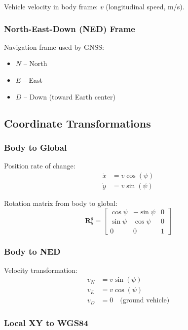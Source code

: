 \documentclass[11pt,a4paper]{article}
\begin{document}
Vehicle velocity in body frame: $v$ (longitudinal speed, m/s).

\subsubsection{North-East-Down (NED) Frame}

Navigation frame used by GNSS:
\begin{itemize}
    \item $N$ -- North
    \item $E$ -- East
    \item $D$ -- Down (toward Earth center)
\end{itemize}

\subsection{Coordinate Transformations}

\subsubsection{Body to Global}

Position rate of change:
\begin{align}
\dot{x} &= v \cos(\psi) \label{eq:xdot}\\
\dot{y} &= v \sin(\psi) \label{eq:ydot}
\end{align}

Rotation matrix from body to global:
\begin{equation}
\mathbf{R}_b^g = \begin{bmatrix}
\cos\psi & -\sin\psi & 0 \\
\sin\psi & \cos\psi & 0 \\
0 & 0 & 1
\end{bmatrix}
\end{equation}

\subsubsection{Body to NED}

Velocity transformation:
\begin{align}
v_N &= v \sin(\psi) \\
v_E &= v \cos(\psi) \\
v_D &= 0 \quad \text{(ground vehicle)}
\end{align}

\subsubsection{Local XY to WGS84}
\end{document}
